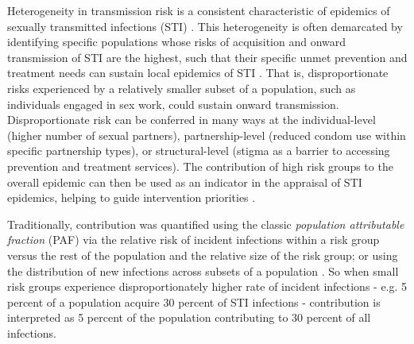 Heterogeneity in transmission risk is a consistent characteristic of
epidemics of sexually transmitted infections (STI) \citep{Anderson1991}.
This heterogeneity is often demarcated by identifying
specific populations whose risks of acquisition and onward transmission of STI are the highest,
such that their specific unmet prevention and treatment needs
can sustain local epidemics of STI \citep{Yorke1978}.
That is, disproportionate risks experienced by a relatively smaller subset
of a population, such as individuals engaged in sex work, could sustain onward transmission.
Disproportionate risk can be conferred in many ways at the
individual-level (higher number of sexual partners), 
partnership-level (reduced condom use within specific partnership types), 
or structural-level (stigma as a barrier to accessing prevention and treatment services). %
The contribution of high risk groups to the overall epidemic
can then be used as an indicator in the appraisal of STI epidemics,
helping to guide intervention priorities
\citep{Shubber2014,Mishra2016}.
\par
Traditionally, contribution was quantified using the classic
\textit{population attributable fraction} (PAF)		%
via the relative risk of incident infections 
within a risk group versus the rest of the population 
and the relative size of the risk group; %
or using the distribution of new infections across subsets of a population  \citep{Case2012,Mishra2014a}.
So when small risk groups experience disproportionately higher rate of 
incident infections - e.g. 5 percent of a population acquire 30 percent 
of STI infections - contribution is interpreted as 5 percent of the population contributing to  %
30 percent of all infections. 

